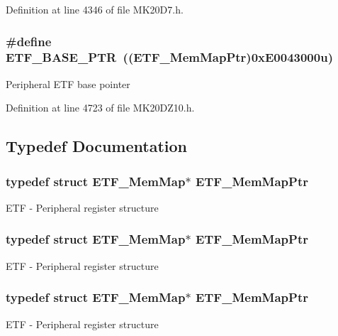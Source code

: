 Definition at line 4346 of file M\+K20\+D7.\+h.

\subsubsection[{\texorpdfstring{E\+T\+F\+\_\+\+B\+A\+S\+E\+\_\+\+P\+TR}{ETF_BASE_PTR}}]{\setlength{\rightskip}{0pt plus 5cm}\#define E\+T\+F\+\_\+\+B\+A\+S\+E\+\_\+\+P\+TR~(({\bf E\+T\+F\+\_\+\+Mem\+Map\+Ptr})0x\+E0043000u)}\hypertarget{group___e_t_f___peripheral_ga46da3f879a5311a0651d7908021daa5e}{}\label{group___e_t_f___peripheral_ga46da3f879a5311a0651d7908021daa5e}
Peripheral E\+TF base pointer 

Definition at line 4723 of file M\+K20\+D\+Z10.\+h.



\subsection{Typedef Documentation}
\subsubsection[{\texorpdfstring{E\+T\+F\+\_\+\+Mem\+Map\+Ptr}{ETF_MemMapPtr}}]{\setlength{\rightskip}{0pt plus 5cm}typedef struct {\bf E\+T\+F\+\_\+\+Mem\+Map}$\ast$ {\bf E\+T\+F\+\_\+\+Mem\+Map\+Ptr}}\hypertarget{group___e_t_f___peripheral_ga3b20bc884bec4b23870d47a4e2f9a118}{}\label{group___e_t_f___peripheral_ga3b20bc884bec4b23870d47a4e2f9a118}
E\+TF -\/ Peripheral register structure 
\subsubsection[{\texorpdfstring{E\+T\+F\+\_\+\+Mem\+Map\+Ptr}{ETF_MemMapPtr}}]{\setlength{\rightskip}{0pt plus 5cm}typedef struct {\bf E\+T\+F\+\_\+\+Mem\+Map}$\ast$ {\bf E\+T\+F\+\_\+\+Mem\+Map\+Ptr}}\hypertarget{group___e_t_f___peripheral_ga3b20bc884bec4b23870d47a4e2f9a118}{}\label{group___e_t_f___peripheral_ga3b20bc884bec4b23870d47a4e2f9a118}
E\+TF -\/ Peripheral register structure 
\subsubsection[{\texorpdfstring{E\+T\+F\+\_\+\+Mem\+Map\+Ptr}{ETF_MemMapPtr}}]{\setlength{\rightskip}{0pt plus 5cm}typedef struct {\bf E\+T\+F\+\_\+\+Mem\+Map}$\ast$ {\bf E\+T\+F\+\_\+\+Mem\+Map\+Ptr}}\hypertarget{group___e_t_f___peripheral_ga3b20bc884bec4b23870d47a4e2f9a118}{}\label{group___e_t_f___peripheral_ga3b20bc884bec4b23870d47a4e2f9a118}
E\+TF -\/ Peripheral register structure 